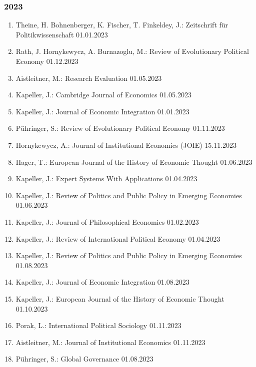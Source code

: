 \subsubsection*{2023}
\begin{enumerate}
	\item Theine, H. Bohnenberger, K.  Fischer, T. Finkeldey, J.: Zeitschrift für Politikwissenschaft 01.01.2023
	\item Rath, J. Hornykewycz, A. Burnazoglu, M.: Review of Evolutionary Political Economy 01.12.2023
	\item Aistleitner, M.: Research Evaluation 01.05.2023
	\item Kapeller, J.: Cambridge Journal of Economics 01.05.2023
	\item Kapeller, J.: Journal of Economic Integration 01.01.2023
	\item Pühringer, S.: Review of Evolutionary Political Economy 01.11.2023
	\item Hornykewycz, A.: Journal of Institutional Economics (JOIE) 15.11.2023
	\item Hager, T.: European Journal of the History of Economic Thought 01.06.2023
	\item Kapeller, J.: Expert Systems With Applications 01.04.2023
	\item Kapeller, J.: Review of Politics and Public Policy in Emerging Economies 01.06.2023
	\item Kapeller, J.: Journal of Philosophical Economics 01.02.2023
	\item Kapeller, J.: Review of International Political Economy 01.04.2023
	\item Kapeller, J.: Review of Politics and Public Policy in Emerging Economies 01.08.2023
	\item Kapeller, J.: Journal of Economic Integration 01.08.2023
	\item Kapeller, J.: European Journal of the History of Economic Thought 01.10.2023
	\item Porak, L.: International Political Sociology 01.11.2023
	\item Aistleitner, M.: Journal of Institutional Economics 01.11.2023
	\item Pühringer, S.: Global Governance 01.08.2023
\end{enumerate}

